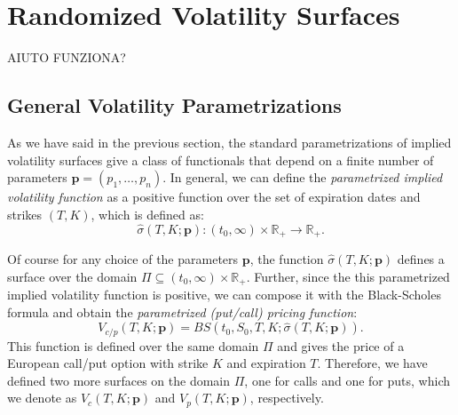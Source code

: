 \section{Randomized Volatility Surfaces}
AIUTO FUNZIONA?

\subsection{General Volatility Parametrizations}
As we have said in the previous section, the standard parametrizations of implied volatility surfaces give a class of functionals that depend on a finite number of parameters $\mathbf{p} = (p_1, \ldots, p_n)$.
In general, we can define the \textit{parametrized implied volatility function} as a positive function over the set of expiration dates and strikes $(T, K)$, which is defined as:
\[
    \hat{\sigma}(T, K; \mathbf{p}) : (t_0, \infty) \times \mathbb{R}_+ \to \mathbb{R}_+.
\]

Of course for any choice of the parameters $\mathbf{p}$, the function $\hat{\sigma}(T, K; \mathbf{p})$ defines a surface over the domain $\Pi \subseteq (t_0, \infty) \times \mathbb{R}_+$.
Further, since the this parametrized implied volatility function is positive, we can compose it with the Black-Scholes formula and obtain the \textit{parametrized (put/call) pricing function}:
\[
    V_{c/p}(T, K; \mathbf{p}) = BS(t_0, S_0, T, K; \hat{\sigma}(T, K; \mathbf{p})).
\]
This function is defined over the same domain $\Pi$ and gives the price of a European call/put option with strike $K$ and expiration $T$.
Therefore, we have defined two more surfaces on the domain $\Pi$, one for calls and one for puts, which we denote as $V_c(T, K; \mathbf{p})$ and $V_p(T, K; \mathbf{p})$, respectively.

